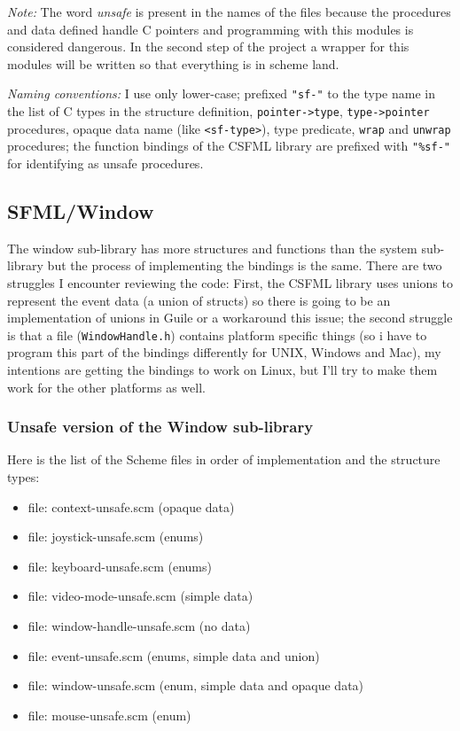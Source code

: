 \documentclass[latterpaper, leqno]{article}
\begin{document}
\emph{Note:} The word \emph{unsafe} is present in the names of the files because the procedures and data defined handle C pointers and programming with this modules is considered dangerous. In the second step of the project a wrapper for this modules will be written so that everything is in scheme land.

\bigskip

\emph{Naming conventions:} I use only lower-case; prefixed \texttt{"sf-"} to the type name in the list of C types in the structure definition, \texttt{pointer->type}, \texttt{type->pointer} procedures, opaque data name (like \texttt{<sf-type>}), type predicate, \texttt{wrap} and \texttt{unwrap} procedures; the function bindings of the CSFML library are prefixed with \texttt{"\%sf-"} for identifying as unsafe procedures.


\subsection{SFML/Window}

The window sub-library has more structures and functions than the system sub-library but the process of implementing the bindings is the same. There are two struggles I encounter reviewing the code: First, the CSFML library uses unions to represent the event data (a union of structs) so there is going to be an implementation of unions in Guile or a workaround this issue; the second struggle is that a file (\texttt{WindowHandle.h}) contains platform specific things (so i have to program this part of the bindings differently for UNIX, Windows and Mac), my intentions are getting the bindings to work on Linux, but I'll try to make them work for the other platforms as well.

\subsubsection*{Unsafe version of the Window sub-library}
Here is the list of the Scheme files in order of implementation and the structure types:

\begin{itemize}
  \item file: context-unsafe.scm (opaque data)
  \item file: joystick-unsafe.scm (enums)
  \item file: keyboard-unsafe.scm (enums)
  \item file: video-mode-unsafe.scm (simple data)
  \item file: window-handle-unsafe.scm (no data)
  \item file: event-unsafe.scm (enums, simple data and union)
  \item file: window-unsafe.scm (enum, simple data and opaque data)
  \item file: mouse-unsafe.scm (enum)
\end{itemize}
\end{document}
